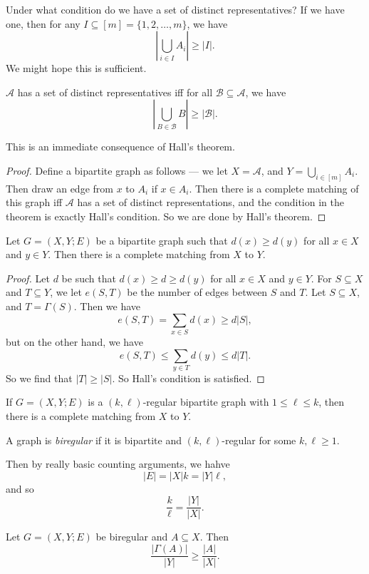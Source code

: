 \documentclass[a4paper]{article}
\begin{document}
Under what condition do we have a set of distinct representatives? If we have one, then for any $I \subseteq [m] = \{1, 2, \ldots, m\}$, we have
\[
  \left|\bigcup_{i \in I} A_i \right| \geq |I|.
\]
We might hope this is sufficient.
\begin{thm}
  $\mathcal{A}$ has a set of distinct representatives iff for all $\mathcal{B} \subseteq \mathcal{A}$, we have
  \[
    \left|\bigcup_{B \in \mathcal{B}} B\right| \geq |\mathcal{B}|.
  \]
\end{thm}

This is an immediate consequence of Hall's theorem.

\begin{proof}
  Define a bipartite graph as follows --- we let $X = \mathcal{A}$, and $Y = \bigcup_{i \in [m]} A_i$. Then draw an edge from $x$ to $A_i$ if $x \in A_i$. Then there is a complete matching of this graph iff $\mathcal{A}$ has a set of distinct representations, and the condition in the theorem is exactly Hall's condition. So we are done by Hall's theorem.
\end{proof}

\begin{thm}
  Let $G = (X, Y; E)$ be a bipartite graph such that $d(x) \geq d(y)$ for all $x \in X$ and $y \in Y$. Then there is a complete matching from $X$ to $Y$.
\end{thm}

\begin{proof}
  Let $d$ be such that $d(x) \geq d \geq d(y)$ for all $x \in X$ and $y \in Y$. For $S \subseteq X$ and $T \subseteq Y$, we let $e(S, T)$ be the number of edges between $S$ and $T$. Let $S \subseteq X$, and $T = \Gamma(S)$. Then we have
  \[
    e(S, T) = \sum_{x \in S} d(x) \geq d |S|,
  \]
  but on the other hand, we have
  \[
    e(S, T) \leq \sum_{y \in T} d(y) \leq d |T|.
  \]
  So we find that $|T| \geq |S|$. So Hall's condition is satisfied.
\end{proof}

\begin{cor}
  If $G = (X, Y; E)$ is a $(k, \ell)$-regular bipartite graph with $1 \leq \ell \leq k$, then there is a complete matching from $X$ to $Y$.
\end{cor}

\begin{defi}
  A graph is \emph{biregular} if it is bipartite and $(k,\ell)$-regular for some $k, \ell \geq 1$.
\end{defi}
Then by really basic counting arguments, we hahve
\[
  |E| = |X| k = |Y| \ell,
\]
and so
\[
  \frac{k}{\ell} = \frac{|Y|}{|X|}.
\]
\begin{thm}
  Let $G = (X, Y; E)$ be biregular and $A \subseteq X$. Then
  \[
    \frac{|\Gamma(A)|}{|Y|}\geq \frac{|A|}{|X|}.
  \]
\end{thm}
\end{document}
